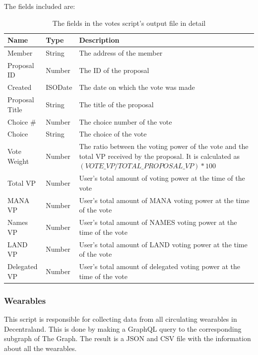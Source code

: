 \documentclass[MSE,Master,english]{twbook}%
\begin{document}
The fields included are:
\begin{table}[H]
  \centering
  \begin{tabularx}{\textwidth}{|l|l|X|}
  \hline
  \textbf{Name} & \textbf{Type} & \textbf{Description}                                             \\ \hline
  Member         & String  & The address of the member                                             \\ \hline
  Proposal ID    & Number  & The ID of the proposal                                                \\ \hline
  Created        & ISODate & The date on which the vote was made                                   \\ \hline
  Proposal Title & String  & The title of the proposal                                             \\ \hline
  Choice \#      & Number  & The choice number of the vote                                         \\ \hline
  Choice         & String  & The choice of the vote                                                \\ \hline
  Vote Weight &
    Number &
    The ratio between the voting power of the vote and the total VP received by the proposal. It is calculated as $(VOTE\_VP / TOTAL\_PROPOSAL\_VP) * 100$ \\ \hline
  Total VP       & Number  & User's total amount of voting power at the time of the vote           \\ \hline
  \gls{MANA} VP        & Number  & User's total amount of \gls{MANA} voting power at the time of the vote      \\ \hline
  Names VP       & Number  & User's total amount of NAMES voting power at the time of the vote     \\ \hline
  \gls{LAND} VP        & Number  & User's total amount of \gls{LAND} voting power at the time of the vote      \\ \hline
  Delegated VP   & Number  & User's total amount of delegated voting power at the time of the vote \\ \hline
  \end{tabularx}
  \caption{The fields in the votes script's output file in detail}
  \label{table:votes}
\end{table}

\subsubsection{Wearables}
This script is responsible for collecting data from all circulating wearables in Decentraland. This is done by making a GraphQL query to the corresponding subgraph of The Graph. The result is a JSON and CSV file with the information about all the wearables. \\
\end{document}
